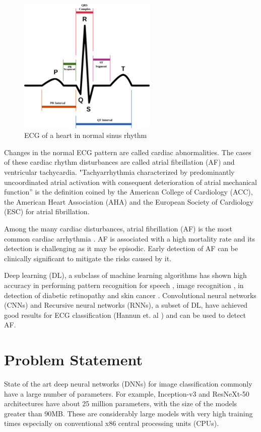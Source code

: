 \begin{figure}[ht]
    \centering
    \includegraphics[width=0.6\linewidth, height=6.5cm]{BachelorMasterThesis/Introduction/Figures/SinusRhythmLabels.svg.png}
    \caption{ECG of a heart in normal sinus rhythm \cite{wiki:Electrocardiography}}
    \label{fig:sinus_rhythm}
\end{figure}

Changes in the normal ECG pattern are called cardiac abnormalities. The cases of these cardiac rhythm disturbances are called atrial fibrillation (AF) and ventricular tachycardia. "Tachyarrhythmia characterized by predominantly uncoordinated atrial activation with consequent deterioration of atrial mechanical function” is the definition coined by the American College of Cardiology (ACC), the American Heart Association (AHA) and the European Society of Cardiology (ESC) \cite{fuster2001acc} for atrial fibrillation.

Among the many cardiac disturbances, atrial fibrillation (AF) is  the most common cardiac arrhythmia \cite{smolen2017atrial} \cite{developed2010guidelines}. AF is associated with a high mortality rate and its detection is challenging as it may be episodic. Early detection of AF can be clinically significant to mitigate the risks caused by it. 

Deep learning (DL), a subclass of machine learning algorithms has shown high accuracy in performing pattern recognition for speech \cite{sak2014long}, image recognition \cite{russakovsky2015imagenet}, in detection of diabetic retinopathy \cite{gulshan2016development} and skin cancer \cite{esteva2017dermatologist}. 
Convolutional neural networks (CNNs) and Recursive neural networks (RNNs), a subset of DL, have achieved good results for ECG classification (Hannun et. al \cite{hannun2019cardiologist}) and can be used to detect AF.

\section{Problem Statement}
\label{sec:problem_statement}
State of the art deep neural networks (DNNs) for image classification commonly have a large number of parameters. For example, Inception-v3 \cite{szegedy2016rethinking} and ResNeXt-50 \cite{xie2017aggregated} architectures have about 25 million parameters, with the size of the models greater than 90MB. These are considerably large models with very high training times especially on conventional x86 central processing units (CPUs). 


